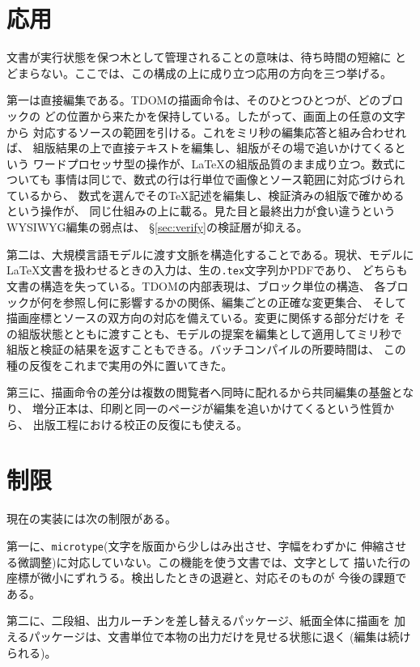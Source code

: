\documentclass[a4paper,11pt]{ltjsarticle}
\newcommand{\tdom}{TDOM}
\newcommand{\code}[1]{\texttt{#1}}
\begin{document}
\section{応用}\label{sec:apps}

文書が実行状態を保つ木として管理されることの意味は、待ち時間の短縮に
とどまらない。ここでは、この構成の上に成り立つ応用の方向を三つ挙げる。

第一は直接編集である。\tdom{}の描画命令は、そのひとつひとつが、どのブロックの
どの位置から来たかを保持している。したがって、画面上の任意の文字から
対応するソースの範囲を引ける。これをミリ秒の編集応答と組み合わせれば、
組版結果の上で直接テキストを編集し、組版がその場で追いかけてくるという
ワードプロセッサ型の操作が、\LaTeX{}の組版品質のまま成り立つ。数式についても
事情は同じで、数式の行は行単位で画像とソース範囲に対応づけられているから、
数式を選んでその\TeX{}記述を編集し、検証済みの組版で確かめるという操作が、
同じ仕組みの上に載る。見た目と最終出力が食い違うというWYSIWYG編集の弱点は、
\S\ref{sec:verify}の検証層が抑える。

第二は、大規模言語モデルに渡す文脈を構造化することである。現状、モデルに
\LaTeX{}文書を扱わせるときの入力は、生の\code{.tex}文字列かPDFであり、
どちらも文書の構造を失っている。\tdom{}の内部表現は、ブロック単位の構造、
各ブロックが何を参照し何に影響するかの関係、編集ごとの正確な変更集合、
そして描画座標とソースの双方向の対応を備えている。変更に関係する部分だけを
その組版状態とともに渡すことも、モデルの提案を編集として適用してミリ秒で
組版と検証の結果を返すこともできる。バッチコンパイルの所要時間は、
この種の反復をこれまで実用の外に置いてきた。

第三に、描画命令の差分は複数の閲覧者へ同時に配れるから共同編集の基盤となり、
増分正本は、印刷と同一のページが編集を追いかけてくるという性質から、
出版工程における校正の反復にも使える。

\section{制限}\label{sec:limits}

現在の実装には次の制限がある。

第一に、\code{microtype}(文字を版面から少しはみ出させ、字幅をわずかに
伸縮させる微調整)に対応していない。この機能を使う文書では、文字として
描いた行の座標が微小にずれうる。検出したときの退避と、対応そのものが
今後の課題である。

第二に、二段組、出力ルーチンを差し替えるパッケージ、紙面全体に描画を
加えるパッケージは、文書単位で本物の出力だけを見せる状態に退く
(編集は続けられる)。
\end{document}
